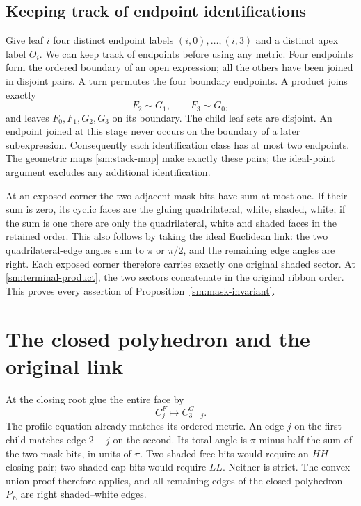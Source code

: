 \subsection{Keeping track of endpoint identifications}
Give leaf $i$ four distinct endpoint labels $(i,0),\ldots,(i,3)$
and a distinct apex label $O_i$. We can keep track of endpoints before
using any metric. Four endpoints form the ordered boundary of an open
expression; all the others have been joined in disjoint pairs. A turn
permutes the four boundary endpoints. A product joins exactly
\begin{equation}\label{sm:terminal-product}
          F_2\sim G_1,\qquad F_3\sim G_0,
\end{equation}
and leaves $F_0,F_1,G_2,G_3$ on its boundary. The child leaf sets are disjoint.
An endpoint joined at this stage never occurs on the boundary of a later subexpression.
Consequently each identification class has at most two endpoints. The geometric maps
\eqref{sm:stack-map} make exactly these pairs; the ideal-point
argument excludes any additional identification.

At an exposed corner the two adjacent mask bits have sum at most one.
If their sum is zero, its cyclic faces are the gluing quadrilateral,
white, shaded, white; if the sum is one there are only the
quadrilateral, white and shaded faces in the retained order.
This also follows by taking the ideal Euclidean link:
the two quadrilateral-edge angles sum to $\pi$ or $\pi/2$,
and the remaining edge angles are right. Each exposed corner
therefore carries exactly one original shaded sector.
At \eqref{sm:terminal-product}, the two sectors concatenate
in the original ribbon order. This proves every assertion of
Proposition~\ref{sm:mask-invariant}.

\section{The closed polyhedron and the original link}\label{sm:cut}

At the closing root glue the entire face by
\begin{equation}\label{sm:closing}
                       C_j^F\longmapsto C_{3-j}^G.
\end{equation}
The profile equation already matches its ordered metric.
An edge $j$ on the first child matches edge $2-j$ on the second.
Its total angle is $\pi$ minus half the sum of the two mask bits,
in units of $\pi$. Two shaded free bits would require an $HH$
closing pair; two shaded cap bits would require $LL$. Neither is
strict. The convex-union proof therefore applies, and all remaining
edges of the closed polyhedron $P_E$ are right shaded--white edges.

